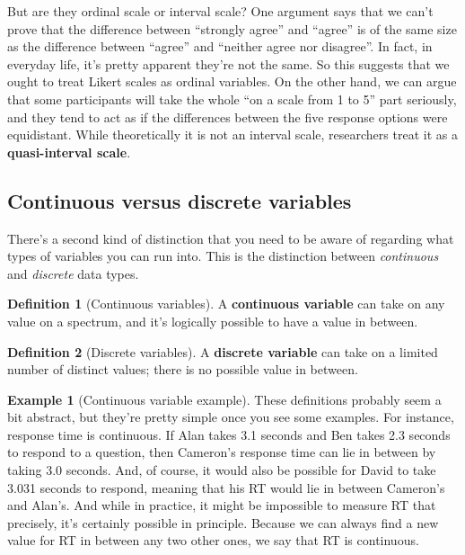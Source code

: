 \documentclass[
  11pt,
]{book}
\theoremstyle{definition}
\newtheorem{definition}{Definition}[chapter]
\theoremstyle{definition}
\newtheorem{example}{Example}[chapter]
\theoremstyle{definition}
\theoremstyle{definition}
\theoremstyle{remark}
\begin{document}
But are they ordinal scale or interval scale? One argument says that we can't prove that the difference between ``strongly agree'' and ``agree'' is of the same size as the difference between ``agree'' and ``neither agree nor disagree''. In fact, in everyday life, it's pretty apparent they're not the same. So this suggests that we ought to treat Likert scales as ordinal variables. On the other hand, we can argue that some participants will take the whole ``on a scale from 1 to 5'' part seriously, and they tend to act as if the differences between the five response options were equidistant. While theoretically it is not an interval scale, researchers treat it as a \textbf{quasi-interval scale}.

\hypertarget{continuousdiscrete}{%
\subsection{Continuous versus discrete variables}\label{continuousdiscrete}}

There's a second kind of distinction that you need to be aware of regarding what types of variables you can run into. This is the distinction between \emph{continuous} and \emph{discrete} data types.

\begin{definition}[Continuous variables]
\protect\hypertarget{def:defcontinuous}{}\label{def:defcontinuous}A \textbf{continuous variable} can take on any value on a spectrum, and it's logically possible to have a value in between.
\end{definition}

\begin{definition}[Discrete variables]
\protect\hypertarget{def:defdiscrete}{}\label{def:defdiscrete}A \textbf{discrete variable} can take on a limited number of distinct values; there is no possible value in between.
\end{definition}

\begin{example}[Continuous variable example]
\protect\hypertarget{exm:excontinuous}{}\label{exm:excontinuous}These definitions probably seem a bit abstract, but they're pretty simple once you see some examples. For instance, response time is continuous. If Alan takes 3.1 seconds and Ben takes 2.3 seconds to respond to a question, then Cameron's response time can lie in between by taking 3.0 seconds. And, of course, it would also be possible for David to take 3.031 seconds to respond, meaning that his RT would lie in between Cameron's and Alan's. And while in practice, it might be impossible to measure RT that precisely, it's certainly possible in principle. Because we can always find a new value for RT in between any two other ones, we say that RT is continuous.
\end{example}
\end{document}
